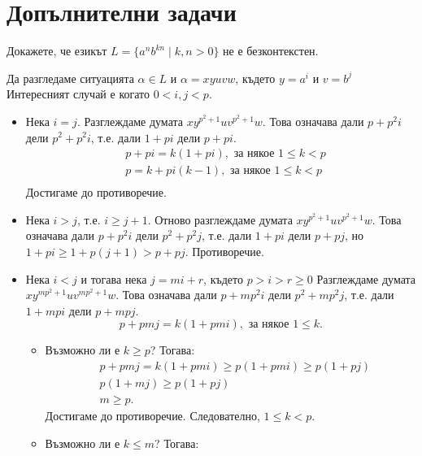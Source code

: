 \section{Допълнителни задачи}





\begin{problem}
  Докажете, че езикът $L = \{a^nb^{kn} \mid k,n > 0\}$ не е безконтекстен.
\end{problem}
\ifhints
\begin{hint}
  Да разгледаме ситуацията $\alpha \in L$ и
  $\alpha = xyuvw$, където $y = a^i$ и $v = b^j$
  Интересният случай е когато $0 < i,j < p$.
  \begin{itemize}
  \item 
    Нека $i = j$.
    Разглеждаме думата $xy^{p^2+1}uv^{p^2+1}w$.
    Това означава дали $p+p^2i$ дели $p^2+p^2i$, т.е.
    дали $1 + pi$ дели $p+pi$.
    \begin{align*}
      & p + pi = k(1+pi), \text{ за някое }1 \leq k < p\\
      & p = k + pi(k-1), \text{ за някое }1 \leq k < p\\
    \end{align*}
    Достигаме до противоречие.
  \item
    Нека $i > j$, т.е. $i \geq j+1$.
    Отново разглеждаме думата $xy^{p^2+1}uv^{p^2+1}w$.
    Това означава дали $p+p^2i$ дели $p^2+p^2j$, т.е.
    дали $1 + pi$ дели $p+pj$, но
    $1+pi \geq 1 + p(j+1) > p + pj$.
    Противоречие.
  \item
    Нека $i < j$ и тогава нека $j = mi + r$, където $p > i > r \geq 0$
    Разглеждаме думата $xy^{mp^2+1}uv^{mp^2+1}w$.
    Това означава дали $p+mp^2i$ дели $p^2+mp^2j$, т.е.
    дали $1 + mpi$ дели $p+mpj$.
    \[p+pmj = k(1+pmi), \text{ за някое }1 \leq k.\]
    \begin{itemize}
    \item 
      Възможно ли е $k \geq p$? Тогава:
      \begin{align*}
        & p + pmj = k(1+pmi) \geq p(1+pmi) \geq p(1+pj)\\
        & p(1+mj) \geq p(1+pj)\\
        & m \geq p.
      \end{align*}
      Достигаме до противоречие.
      Следователно, $1 \leq k < p$.
    \item
      Възможно ли е $k \leq m$? Тогава:
      \begin{align*}

\end{align*}
\end{itemize}
\end{itemize}
\end{hint}
